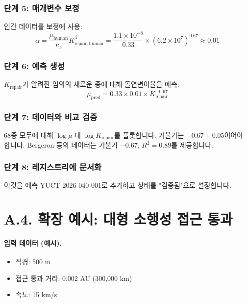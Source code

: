 \documentclass[13pt,a4paper]{article}
\begin{document}
	\subsubsection*{단계 5: 매개변수 보정}
	인간 데이터를 보정에 사용:
	\[
	\alpha = \frac{\mu_{\mathrm{human}}}{\kappa_c} K_{\mathrm{repair,human}}^{\beta} = \frac{1.1\times 10^{-8}}{0.33} \times (6.2\times 10^7)^{0.67} \approx 0.01
	\]
	
	\subsubsection*{단계 6: 예측 생성}
	$K_{\mathrm{repair}}$가 알려진 임의의 새로운 종에 대해 돌연변이율을 예측:
	\[
	\mu_{\mathrm{pred}} = 0.33 \times 0.01 \times K_{\mathrm{repair}}^{-0.67}
	\]
	
	\subsubsection*{단계 7: 데이터와 비교 검증}
	68종 모두에 대해 $\log \mu$ 대 $\log K_{\mathrm{repair}}$를 플롯합니다. 기울기는 $-0.67 \pm 0.05$이어야 합니다. Bergeron 등의 데이터는 기울기 $-0.67$, $R^2 = 0.89$를 제공합니다.
	
	\subsubsection*{단계 8: 레지스트리에 문서화}
	이것을 예측 YUCT-2026-040-001로 추가하고 상태를 "검증됨"으로 설정합니다.
	
	
	\section*{A.4. 확장 예시: 대형 소행성 접근 통과}
	
	\paragraph{입력 데이터 (예시).}
	\begin{itemize}[leftmargin=*]
		\item 직경: 500 m
		\item 접근 통과 거리: 0.002 AU (300,000 km)
		\item 속도: 15 km/s
	\end{itemize}
	
\end{document}
